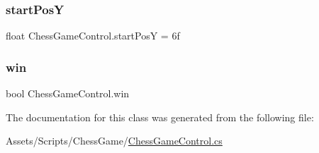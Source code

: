 \subsubsection{\texorpdfstring{start\+PosY}{startPosY}}
{\footnotesize\ttfamily float Chess\+Game\+Control.\+start\+PosY = 6f}

\mbox{\label{class_chess_game_control_a50c474be4f430b946ca89f3e898a25a1}} 
\subsubsection{\texorpdfstring{win}{win}}
{\footnotesize\ttfamily bool Chess\+Game\+Control.\+win\hspace{0.3cm}{\ttfamily [static]}}



The documentation for this class was generated from the following file\+:\begin{DoxyCompactItemize}
\item 
Assets/\+Scripts/\+Chess\+Game/\mbox{\hyperlink{_chess_game_control_8cs}{Chess\+Game\+Control.\+cs}}\end{DoxyCompactItemize}
